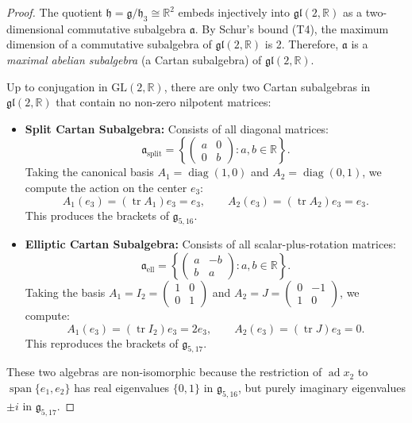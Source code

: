 \documentclass[11pt,a4paper]{article}
\theoremstyle{definition}
\theoremstyle{remark}
\newcommand{\R}{\mathbb{R}}
\newcommand{\g}{\mathfrak{g}}
\newcommand{\hh}{\mathfrak{h}}
\newcommand{\ad}{\operatorname{ad}}
\newcommand{\tr}{\operatorname{tr}}
\newcommand{\diag}{\operatorname{diag}}
\newcommand{\spanop}{\operatorname{span}}
\begin{document}
\begin{proof}
The quotient $\mathfrak{h} = \g/\hh_3 \cong \R^2$ embeds injectively into $\mathfrak{gl}(2, \R)$ as a two-dimensional commutative subalgebra $\mathfrak{a}$. By Schur's bound (T4), the maximum dimension of a commutative subalgebra of $\mathfrak{gl}(2, \R)$ is 2. Therefore, $\mathfrak{a}$ is a \emph{maximal abelian subalgebra} (a Cartan subalgebra) of $\mathfrak{gl}(2, \R)$.

Up to conjugation in $\mathrm{GL}(2, \R)$, there are only two Cartan subalgebras in $\mathfrak{gl}(2, \R)$ that contain no non-zero nilpotent matrices:
\begin{itemize}
    \item \textbf{Split Cartan Subalgebra:} Consists of all diagonal matrices:
    \begin{equation}
        \mathfrak{a}_{\text{split}} = \left\{ \begin{pmatrix} a & 0 \\ 0 & b \end{pmatrix} : a, b \in \R \right\}.
    \end{equation}
    Taking the canonical basis $A_1 = \diag(1, 0)$ and $A_2 = \diag(0, 1)$, we compute the action on the center $e_3$:
    \begin{equation}
        A_1(e_3) = (\tr A_1) e_3 = e_3, \qquad A_2(e_3) = (\tr A_2) e_3 = e_3.
    \end{equation}
    This produces the brackets of $\g_{5,16}$.
    
    \item \textbf{Elliptic Cartan Subalgebra:} Consists of all scalar-plus-rotation matrices:
    \begin{equation}
        \mathfrak{a}_{\text{ell}} = \left\{ \begin{pmatrix} a & -b \\ b & a \end{pmatrix} : a, b \in \R \right\}.
    \end{equation}
    Taking the basis $A_1 = I_2 = \begin{pmatrix} 1 & 0 \\ 0 & 1 \end{pmatrix}$ and $A_2 = J = \begin{pmatrix} 0 & -1 \\ 1 & 0 \end{pmatrix}$, we compute:
    \begin{equation}
        A_1(e_3) = (\tr I_2) e_3 = 2e_3, \qquad A_2(e_3) = (\tr J) e_3 = 0.
    \end{equation}
    This reproduces the brackets of $\g_{5,17}$.
\end{itemize}
These two algebras are non-isomorphic because the restriction of $\ad x_2$ to $\spanop\{e_1, e_2\}$ has real eigenvalues $\{0, 1\}$ in $\g_{5,16}$, but purely imaginary eigenvalues $\pm i$ in $\g_{5,17}$.
\end{proof}
\end{document}
